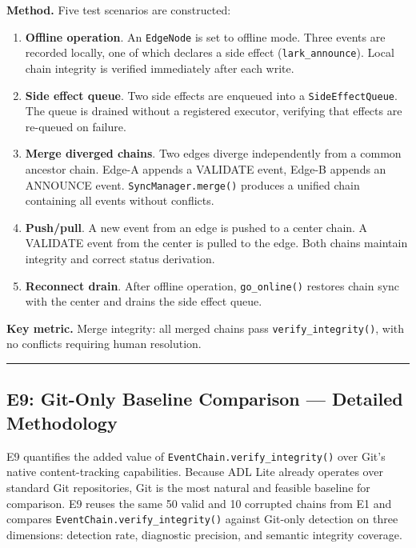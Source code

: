 \textbf{Method.} Five test scenarios are constructed:

\begin{enumerate}
\def\labelenumi{\arabic{enumi}.}
\tightlist
\item
  \textbf{Offline operation}. An \texttt{EdgeNode} is set to offline mode. Three events are recorded locally, one of which declares a side effect (\texttt{lark\_announce}). Local chain integrity is verified immediately after each write.
\item
  \textbf{Side effect queue}. Two side effects are enqueued into a \texttt{SideEffectQueue}. The queue is drained without a registered executor, verifying that effects are re-queued on failure.
\item
  \textbf{Merge diverged chains}. Two edges diverge independently from a common ancestor chain. Edge-A appends a VALIDATE event, Edge-B appends an ANNOUNCE event. \texttt{SyncManager.merge()} produces a unified chain containing all events without conflicts.
\item
  \textbf{Push/pull}. A new event from an edge is pushed to a center chain. A VALIDATE event from the center is pulled to the edge. Both chains maintain integrity and correct status derivation.
\item
  \textbf{Reconnect drain}. After offline operation, \texttt{go\_online()} restores chain sync with the center and drains the side effect queue.
\end{enumerate}

\textbf{Key metric.} Merge integrity: all merged chains pass \texttt{verify\_integrity()}, with no conflicts requiring human resolution.

\begin{center}\rule{0.5\linewidth}{0.5pt}\end{center}

\subsection{E9: Git-Only Baseline Comparison --- Detailed Methodology}\label{e9-git-only-baseline-comparison-detailed-methodology}

E9 quantifies the added value of \texttt{EventChain.verify\_integrity()} over Git's native content-tracking capabilities. Because ADL Lite already operates over standard Git repositories, Git is the most natural and feasible baseline for comparison. E9 reuses the same 50 valid and 10 corrupted chains from E1 and compares \texttt{EventChain.verify\_integrity()} against Git-only detection on three dimensions: detection rate, diagnostic precision, and semantic integrity coverage.

